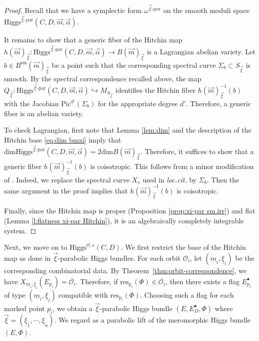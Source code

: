 \documentclass[11pt]{amsart}
\theoremstyle{plain}
\theoremstyle{definition}
\theoremstyle{remark}
\newcommand{\Pic}{\mathrm{Pic}}
\newcommand{\cO}{\mathcal O}
\newcommand{\Higgs}{\mathrm{Higgs}}
\def\dim{\mathrm{dim}}
\def\Pic{\textrm{Pic}}
\def\res{\mathrm{res}}
\def\uxi{{\underline{\xi}}}
\def\vxi{\vec{\xi}}
\def\vm{\vec{m}}
\def\um{{\underline{m}}}
\begin{document}
\begin{proof}
	Recall that we have a symplectic form $\omega^{\vxi\text{-par}}$ on the smooth moduli space $\Higgs^{\vec\xi\text{-par}}(C,D,\vec m,\vec\alpha)$.

	It remains to show that a generic fiber of the Hitchin map
	$h(\vm)_{\vxi}:\Higgs^{\vec\xi\text{-par}}(C,D,\vec m,\vec\alpha)\to B(\vec m)_{\vec\xi}$
	is a Lagrangian abelian variety. Let $b\in B^{\mathrm{sm}}(\vec m)_{\vec\xi}$ be a point such that the corresponding spectral curve $\Sigma_b\subset S_{\vec\xi}$ is smooth. By the spectral correspondence recalled above, the map $Q_{\vec\xi}:\Higgs^{\vec\xi\text{-par}}(C,D,\vec m,\vec\alpha)\hookrightarrow M_{S_{\vec\xi}}$ identifies the Hitchin fiber $h(\vm)_{\vxi}^{-1}(b)$ with the Jacobian $\Pic^{d'}(\Sigma_b)$ for the appropriate degree $d'$. Therefore, a generic fiber is an abelian variety. 

    To check Lagrangian, first note that Lemma \ref{lem:dim} and the description of the Hitchin base \eqref{eq:dim bmxi} imply that
	$\dim \Higgs^{\vec\xi\text{-par}}(C,D,\vec m,\vec\alpha)=2\dim B(\vec m)_{\vec\xi}$. Therefore, it suffices to show that a generic fiber $h(\vm)_{\vxi}^{-1}(b)$ is coisotropic. This follows from a minor modification of \cite[Proposition 3.12, 3.13]{logaresMartens}. Indeed, we replace the spectral curve $X_s$ used in \textit{loc.cit.} by $\Sigma_b$. Then the same argument in the proof implies that $h(\vm)_{\vxi}^{-1}(b)$ is coisotropic.

    Finally, since the Hitchin map is proper (Proposition \ref{prop:xi-par sm.irr}) and flat (Lemma \ref{l:flatness xi-par Hitchin}), it is an algebraically completely integrable system.

\end{proof}

Next, we move on to $\Higgs^{\cO,s}(C,D)$. We first restrict the base of the Hitchin map as done in $\vxi$-parabolic Higgs bundles. For each orbit $\mathcal O_i$, let $(\um_i,\uxi_i)$ be the corresponding combinatorial data. By Theorem~\ref{thm:orbit-correspondence}, we have
$X_{\um_i,\uxi_i}(E_{p_i})=\overline{\mathcal O_i}$.
Therefore, if $\res_{p_i}(\Phi)\in\overline{\mathcal O_i}$, then there exists a flag $E_{p_i}^\bullet$ of type $(\um_i,\uxi_i)$ compatible with $\res_{p_i}(\Phi)$. Choosing such a flag for each marked point $p_i$, we obtain a $\vec\xi$-parabolic Higgs bundle $(E,E_D^\bullet,\Phi)$ where $\vec\xi=(\uxi_1, \cdots, \uxi_n)$. We regard as a parabolic lift of the meromorphic Higgs bundle $(E,\Phi)$.
\end{document}
